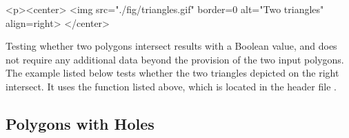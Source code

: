 \lcTex{%
  \vspace{-20pt}
  \setlength{\widthRight}{1.4cm}
  \setlength{\widthLeft}{\widthLineReal}
  \addtolength{\widthLeft}{-\widthRight}
  \begin{minipage}{\widthLeft}
}
\label{fig:example}
\begin{ccHtmlOnly}
  <p><center>
    <img src="./fig/triangles.gif" border=0 alt="Two triangles" align=right>
  </center>
\end{ccHtmlOnly}
Testing whether two polygons intersect results with a Boolean value, 
and does not require any additional data beyond the provision of the 
two input polygons. The example listed below tests whether the two
triangles depicted on the right intersect. It uses the function
 listed above, which is located in the header file
.

\lcTex{\vspace{-20pt}}

\subsection{Polygons with Holes}
\label{bso_ssec:polygons_with_holes}

